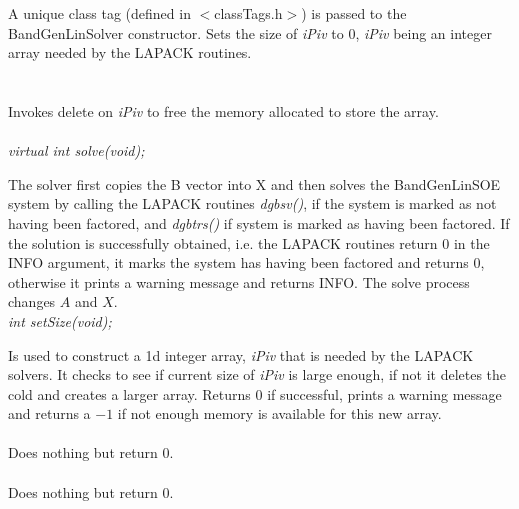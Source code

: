 A unique class tag (defined in $<$classTags.h$>$) is passed to the
BandGenLinSolver constructor. Sets the size of {\em iPiv} to $0$, {\em
iPiv} being an integer array needed by the LAPACK routines. \\

 \\
\\ 
Invokes delete on {\em iPiv} to free the memory allocated to store the
array. \\ 

  \\
{\em virtual int solve(void);} 

The solver first copies the B vector into X and then solves the
BandGenLinSOE system by calling the LAPACK routines {\em
dgbsv()}, if the system is marked as not having been factored, and {\em
dgbtrs()} if system is marked as having been factored. If the
solution is successfully obtained, i.e. the LAPACK routines return $0$
in the INFO argument, it marks the system has having been
factored and returns $0$, otherwise it prints a warning message and
returns INFO. The solve process changes $A$ and $X$. \\   

{\em int setSize(void);} 

Is used to construct a 1d integer array, {\em iPiv} that is needed by
the LAPACK solvers. It checks to see if current size of {\em iPiv} is
large enough, if not it deletes the cold and creates a larger
array. Returns $0$ if successful, prints a warning message and returns
a $-1$ if not enough memory is available for this new array. \\


 \\ 
Does nothing but return $0$. \\

 \\ 
Does nothing but return $0$. \\
